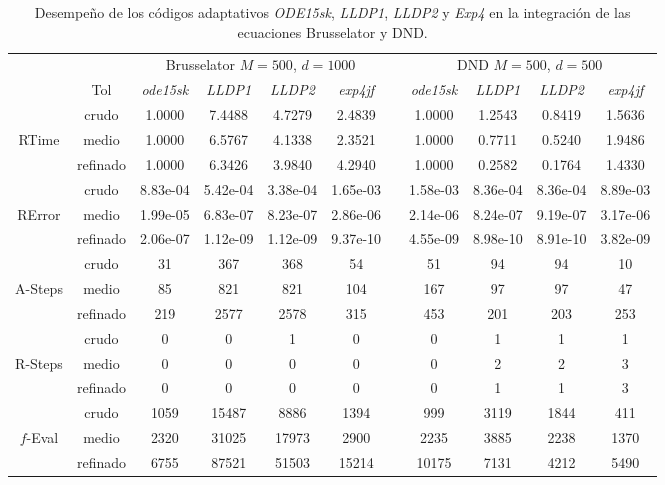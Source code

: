 \begin{table}
	\caption{Desempeño de los códigos adaptativos \emph{ODE15sk}, \emph{LLDP1}, \emph{LLDP2} y \emph{Exp4} en la integración de las ecuaciones Brusselator y DND.}
	\label{tab:brussdnd}
	\begin{adjustbox}{width=0.95\columnwidth,center}
		\begin{tabular}{ccccccccccc}
			\hline
			&  & \multicolumn{4}{c}{Brusselator $M=500$, $d=1000$} &  & \multicolumn{4}{c}{DND $M=500$, $d=500$} \\
			\cline{3-6}\cline{8-11} & Tol & \emph{ode15sk} & \emph{LLDP1} & \emph{LLDP2} & \emph{exp4jf} &  & \emph{ode15sk} & \emph{LLDP1} & \emph{LLDP2} & \emph{exp4jf} \\
			\hline
			& crudo & 1.0000 & 7.4488 & 4.7279 & 2.4839 &  & 1.0000 & 1.2543 & 0.8419 & 1.5636 \\
			RTime & medio & 1.0000 & 6.5767 & 4.1338 & 2.3521 &  & 1.0000 & 0.7711 & 0.5240 & 1.9486 \\
			& refinado & 1.0000 & 6.3426 & 3.9840 & 4.2940 &  & 1.0000 & 0.2582 & 0.1764 & 1.4330 \\
			\hline
			& crudo & 8.83e-04 & 5.42e-04 & 3.38e-04 & 1.65e-03 &  & 1.58e-03 & 8.36e-04 & 8.36e-04 & 8.89e-03 \\
			RError & medio & 1.99e-05 & 6.83e-07 & 8.23e-07 & 2.86e-06 &  & 2.14e-06 & 8.24e-07 & 9.19e-07 & 3.17e-06 \\
			& refinado & 2.06e-07 & 1.12e-09 & 1.12e-09 & 9.37e-10 &  & 4.55e-09 & 8.98e-10 & 8.91e-10 & 3.82e-09 \\
			\hline
			& crudo & 31 & 367 & 368 & 54 &  & 51 & 94 & 94 & 10 \\
			A-Steps & medio & 85 & 821 & 821 & 104 &  & 167 & 97 & 97 & 47 \\
			& refinado & 219 & 2577 & 2578 & 315 &  & 453 & 201 & 203 & 253 \\
			\hline
			& crudo & 0 & 0 & 1 & 0 &  & 0 & 1 & 1 & 1 \\
			R-Steps & medio & 0 & 0 & 0 & 0 &  & 0 & 2 & 2 & 3 \\
			& refinado & 0 & 0 & 0 & 0 &  & 0 & 1 & 1 & 3 \\
			\hline
			& crudo & 1059 & 15487 & 8886 & 1394 &  & 999 & 3119 & 1844 & 411 \\
			$f$-Eval & medio & 2320 & 31025 & 17973 & 2900 &  & 2235 & 3885 & 2238 & 1370 \\
			& refinado & 6755 & 87521 & 51503 & 15214 &  & 10175 & 7131 & 4212 & 5490 \\

\end{tabular}
\end{adjustbox}
\end{table}
